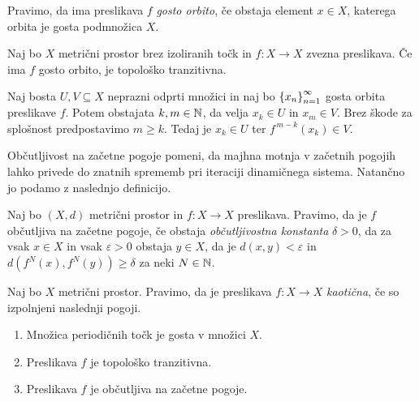 Pravimo, da ima preslikava \(f\) \emph{gosto orbito}, če obstaja element \(x \in X\), katerega orbita je gosta podmnožica \(X\).

\begin{trditev} \label{prop:tridevet}
    Naj bo \(X\) metrični prostor brez izoliranih točk in \(f \colon X \to X\) zvezna preslikava. Če ima \(f\) gosto orbito, je topološko tranzitivna.
\end{trditev}

\begin{dokaz}
    Naj bosta \(U, V \subseteq X\) neprazni odprti množici in naj bo \(\left\{ x_n \right\}_{n = 1}^{\infty}\) gosta orbita preslikave \(f\). Potem obstajata \(k, m \in \mathbb N\), da velja \(x_k \in U\) in \(x_m \in V\). Brez škode za splošnost predpostavimo \(m \geq k\). Tedaj je \(x_k \in U\) ter \(f^{\, m - k} (x_k) \in V\).

\end{dokaz}

Občutljivost na začetne pogoje pomeni, da majhna motnja v začetnih pogojih lahko privede do znatnih sprememb pri iteraciji dinamičnega sistema. Natančno jo podamo z naslednjo definicijo.

\begin{definicija}
    Naj bo \((X, d)\) metrični prostor in \(f \colon X \to X\) preslikava. Pravimo, da je \(f\) občutljiva na začetne pogoje, če obstaja \emph{občutljivostna konstanta} \(\delta > 0\), da za vsak \(x \in X\) in vsak \(\varepsilon > 0\) obstaja \(y \in X\), da je \(d (x, y) < \varepsilon\) in \(d (f^N (x), f^N (y)) \geq \delta\) za neki \(N \in \mathbb N\).
\end{definicija}

\begin{definicija}
    Naj bo \(X\) metrični prostor. Pravimo, da je preslikava \(f \colon X \to X\) \emph{kaotična}, če so izpolnjeni naslednji pogoji.
    \begin{enumerate}
        \item Množica periodičnih točk je gosta v množici \(X\).
        \item Preslikava \(f\) je topološko tranzitivna.
        \item Preslikava \(f\) je občutljiva na začetne pogoje.
    \end{enumerate}
\end{definicija}

